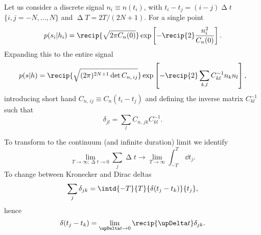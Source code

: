 Let us consider a discrete signal $n_i \equiv n(t_i)$, with $t_i - t_j = (i - j)\upDelta t$ $\{i,j = -N, \ldots, N\}$ and $\upDelta T = 2T/(2N + 1)$. For a single point~\citep{Finn1992}
\begin{equation}
p(s_i|h_i) = \recip{\sqrt{2\pi C_n(0)}} \exp\left[-\recip{2} \frac{n_i^2}{C_n(0)}\right].
\end{equation}
Expanding this to the entire signal
\begin{equation}
p(s|h) = \recip{\sqrt{(2\pi)^{2N+1} \det C_{n,\,ij}}} \exp\left[-\recip{2} \sum_{k,l}C^{-1}_{kl}n_k n_l\right],
\label{eq:prod_prob}
\end{equation}
introducing short hand $C_{n,\,ij} \equiv C_n(t_i - t_j)$ and defining the inverse matrix $C^{-1}_{kl}$ such that
\begin{equation}
\delta_{jl} = \sum_l C_{n,\,jk}C^{-1}_{kl}.
\end{equation}

To transform to the continuum (and infinite duration) limit we identify
\begin{equation}
\lim_{T \rightarrow \infty; \upDelta t \rightarrow 0} \sum_j \upDelta t \rightarrow \lim_{T \rightarrow \infty} \int_{-T}^{T}\,\dd t_j.
\end{equation}
To change between Kronecker and Dirac deltas
\begin{equation}
\sum_j \delta_{jk} = \intd{-T}{T}{\delta(t_j - t_k)}{t_j},
\end{equation}
hence
\begin{equation}
\delta(t_j - t_k) = \lim_{\upDelta t \rightarrow 0} \recip{\upDelta t} \delta_{jk}.
\end{equation}


